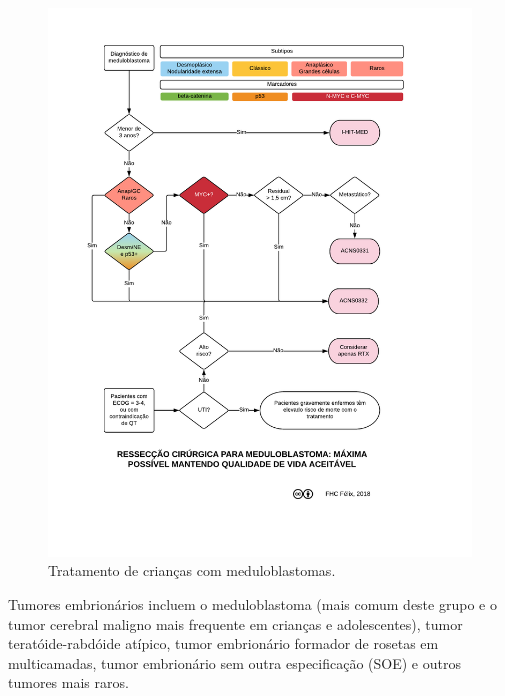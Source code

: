 \documentclass[graybox]{svmult}
\begin{document}
\begin{figure}[!htb]
\includegraphics[scale=0.65,trim = 18mm 28mm 15mm 12mm,clip]{fig/fig5.pdf}
\caption{Tratamento de crianças com meduloblastomas.}
\end{figure}

Tumores embrionários incluem o meduloblastoma (mais comum deste grupo e o tumor cerebral maligno mais frequente em crianças e adolescentes), tumor teratóide-rabdóide atípico, tumor embrionário formador de rosetas em multicamadas, tumor embrionário sem outra especificação (SOE) e outros tumores mais raros. 
\end{document}
